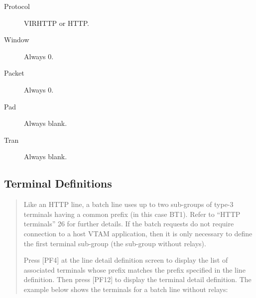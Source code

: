 \documentclass[letterpaper,10pt,english]{sphinxmanual}
\begin{document}
\begin{description}
\item[{Protocol}] \leavevmode
VIRHTTP or HTTP.

\item[{Window}] \leavevmode
Always 0.

\item[{Packet}] \leavevmode
Always 0.

\item[{Pad}] \leavevmode
Always blank.

\item[{Tran}] \leavevmode
Always blank.

\end{description}

\ignorespaces 

\subsection{Terminal Definitions}
\label{\detokenize{connectivity_guide:index-33}}\label{\detokenize{connectivity_guide:id11}}\begin{quote}

Like an HTTP line, a batch line uses up to two sub-groups of type-3 terminals having a common prefix (in this case BT1). Refer to “HTTP terminals” 26 for further details. If the batch requests do not require connection to a host VTAM application, then it is only necessary to define the first terminal sub-group (the sub-group without relays).

Press {[}PF4{]} at the line detail definition screen to display the list of associated terminals whose prefix matches the prefix specified in the line definition. Then press {[}PF12{]} to display the terminal detail definition. The example below shows the terminals for a batch line without relays:
\end{quote}



\newpage

\ignorespaces 
\end{document}
